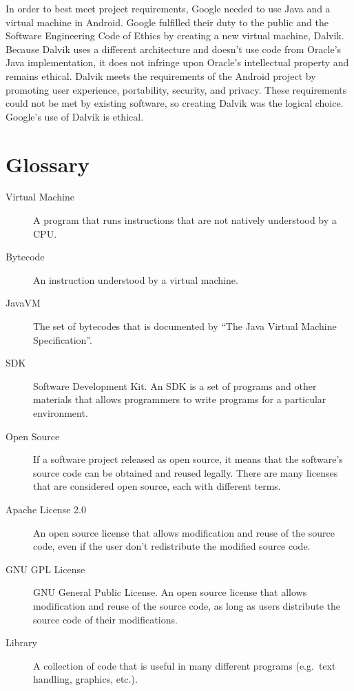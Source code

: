 \documentclass[11pt]{article}
\begin{document}
\begin{multicols}{2}
In order to best meet project requirements, Google needed to use Java and a
virtual machine in Android.  Google fulfilled their duty to the public and the
Software Engineering Code of Ethics by creating a new virtual machine, Dalvik.
Because Dalvik uses a different architecture and doesn't use code from Oracle's
Java implementation, it does not infringe upon Oracle's intellectual property
and remains ethical.  Dalvik meets the requirements of the Android project by
promoting user experience, portability, security, and privacy.  These
requirements could not be met by existing software, so creating Dalvik was the
logical choice.  Google's use of Dalvik is ethical.


\appendix

\section{Glossary} %
\label{sec:glossary}

\begin{description}
    \item[Virtual Machine] A program that runs instructions that are not
    natively understood by a CPU.
    \item[Bytecode] An instruction understood by a virtual machine.
    \item[JavaVM] The set of bytecodes that is documented by ``The Java Virtual
    Machine Specification''. \cite{javavm-bytecode}
    \item[SDK] Software Development Kit.  An SDK is a set of programs and other
    materials that allows programmers to write programs for a particular
    environment.
    \item[Open Source] If a software project released as open source, it means
    that the software's source code can be obtained and reused legally.  There
    are many licenses that are considered open source, each with different
    terms.
    \item[Apache License 2.0] An open source license that allows modification
    and reuse of the source code, even if the user don't redistribute the
    modified source code. \cite{apache-license}
    \item[GNU GPL License] GNU General Public License.  An open source license
    that allows modification and reuse of the source code, as long as users
    distribute the source code of their modifications. \cite{gpl-license}
    \item[Library] A collection of code that is useful in many different
    programs (e.g.\ text handling, graphics, etc.).
\end{description}


\end{multicols}
\newpage

\nocite{*}


\end{document}
